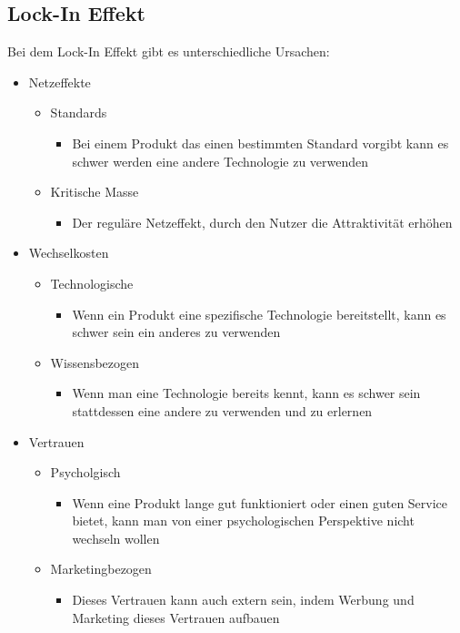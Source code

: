 \documentclass{article}
\begin{document}
		\subsection{Lock-In Effekt}
		Bei dem Lock-In Effekt gibt es unterschiedliche Ursachen:
		\begin{itemize}
			\item{Netzeffekte}
			\begin{itemize}
				\item{Standards}
				\begin{itemize}
					\item{Bei einem Produkt das einen bestimmten Standard vorgibt kann es schwer werden eine andere Technologie zu verwenden}
				\end{itemize}
			\item{Kritische Masse}
			\begin{itemize}
				\item{Der reguläre Netzeffekt, durch den Nutzer die Attraktivität erhöhen}
			\end{itemize}
			\end{itemize}
			\item{Wechselkosten}
			\begin{itemize}
				\item{Technologische}
				\begin{itemize}
					\item{Wenn ein Produkt eine spezifische Technologie bereitstellt, kann es schwer sein ein anderes zu verwenden}
				\end{itemize}
				\item{Wissensbezogen}
				\begin{itemize}
					\item{Wenn man eine Technologie bereits kennt, kann es schwer sein stattdessen eine andere zu verwenden und zu erlernen}
				\end{itemize}
			\end{itemize}
			\item{Vertrauen}
				\begin{itemize}
					\item{Psycholgisch}
					\begin{itemize}
						\item{Wenn eine Produkt lange gut funktioniert oder einen guten Service bietet, kann man von einer psychologischen Perspektive nicht wechseln wollen}
					\end{itemize}
					\item{Marketingbezogen}
					\begin{itemize}
						\item{Dieses Vertrauen kann auch extern sein, indem Werbung und Marketing dieses Vertrauen aufbauen}
					\end{itemize}
				\end{itemize}
		\end{itemize}
\end{document}
